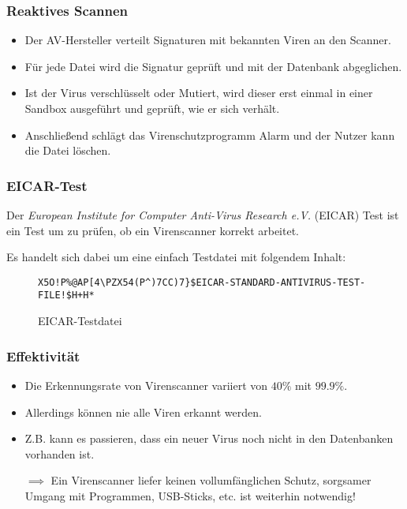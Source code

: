 		\subsubsection{Reaktives Scannen}
			\begin{itemize}
				\item Der AV-Hersteller verteilt Signaturen mit bekannten Viren an den Scanner.
				\item Für jede Datei wird die Signatur geprüft und mit der Datenbank abgeglichen.
				\item Ist der Virus verschlüsselt oder Mutiert, wird dieser erst einmal in einer Sandbox ausgeführt und geprüft, wie er sich verhält.
				\item Anschließend schlägt das Virenschutzprogramm Alarm und der Nutzer kann die Datei löschen.
			\end{itemize}

		\subsubsection{EICAR-Test}
			Der \textit{European Institute for Computer Anti-Virus Research e.V.} (EICAR) Test ist ein Test um zu prüfen, ob ein Virenscanner korrekt arbeitet.

			Es handelt sich dabei um eine einfach Testdatei mit folgendem Inhalt:
			\begin{figure}[H]
				\centering
				\texttt{X5O!P\%@AP[4\textbackslash{}PZX54(P\^{})7CC)7\}\$EICAR-STANDARD-ANTIVIRUS-TEST-FILE!\$H+H*}
				\caption{EICAR-Testdatei}
			\end{figure}

		\subsubsection{Effektivität}
			\begin{itemize}
				\item Die Erkennungsrate von Virenscanner variiert von \(40\%\) mit \(99.9\%\).
				\item Allerdings können nie alle Viren erkannt werden.
				\item Z.B. kann es passieren, dass ein neuer Virus noch nicht in den Datenbanken vorhanden ist.
				\item[\(\implies\)] Ein Virenscanner liefer keinen vollumfänglichen Schutz, sorgsamer Umgang mit Programmen, USB-Sticks, etc. ist weiterhin notwendig!
			\end{itemize}

